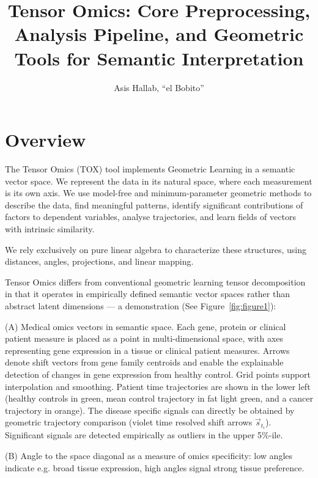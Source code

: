 \documentclass{article}
\title{Tensor Omics: Core Preprocessing, Analysis Pipeline, and Geometric Tools
  for Semantic Interpretation}
\author{Asis Hallab, ``el Bobito''}
\begin{document}
\maketitle

\tableofcontents
\newpage

\section{Overview}

The Tensor Omics (TOX) tool implements Geometric Learning in a semantic vector space. We represent the data in its natural space, where each measurement is its own axis. We use model-free and minimum-parameter geometric methods to describe the data, find meaningful patterns, identify significant contributions of factors to dependent variables, analyse trajectories, and learn fields of vectors with intrinsic similarity. 

We rely exclusively on pure linear algebra to characterize these structures, using distances, angles, projections, and linear mapping.

\vspace{0.5cm}
Tensor Omics differs from conventional geometric learning tensor decomposition in that it operates in empirically defined semantic vector spaces rather than abstract latent dimensions --- a demonstration (See Figure~\ref{fig:figure1}):

\vspace{0.5cm}
(A) Medical omics vectors in semantic space. Each gene, protein or clinical patient measure is placed as a point in multi-dimensional space, with axes representing gene expression in a tissue or clinical patient measures. Arrows denote shift vectors from gene family centroids and enable the explainable detection of changes in gene expression from healthy control. Grid points support interpolation and smoothing. Patient time trajectories are shown in the lower left (healthy controls in green, mean control trajectory in fat light green, and a cancer trajectory in orange). The disease specific signals can directly be obtained by geometric trajectory comparison (violet time resolved shift arrows $\vec{s}_{t_i}$). Significant signals are detected empirically as outliers in the upper 5\%-ile.

\vspace{0.5cm}
(B) Angle to the space diagonal as a measure of omics specificity: low angles indicate e.g. broad tissue expression, high angles signal strong tissue preference.
\end{document}
